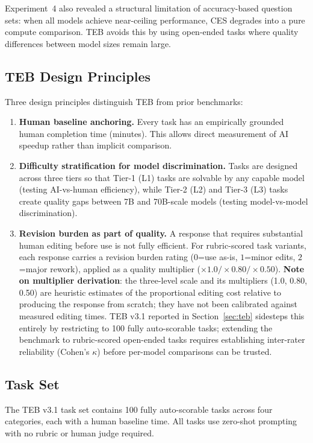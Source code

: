 \documentclass[12pt]{article}
\begin{document}
Experiment~4 also revealed a structural limitation of accuracy-based question sets: when all models achieve near-ceiling performance, CES degrades into a pure compute comparison. TEB avoids this by using open-ended tasks where quality differences between model sizes remain large.

\subsection{TEB Design Principles}

Three design principles distinguish TEB from prior benchmarks:

\begin{enumerate}
    \item \textbf{Human baseline anchoring.} Every task has an empirically grounded human completion time (minutes). This allows direct measurement of AI speedup rather than implicit comparison.
    \item \textbf{Difficulty stratification for model discrimination.} Tasks are designed across three tiers so that Tier-1 (L1) tasks are solvable by any capable model (testing AI-vs-human efficiency), while Tier-2 (L2) and Tier-3 (L3) tasks create quality gaps between 7B and 70B-scale models (testing model-vs-model discrimination).
    \item \textbf{Revision burden as part of quality.} A response that requires substantial human editing before use is not fully efficient. For rubric-scored task variants, each response carries a revision burden rating ($0$=use as-is, $1$=minor edits, $2$=major rework), applied as a quality multiplier ($\times 1.0 / \times 0.80 / \times 0.50$). \textbf{Note on multiplier derivation}: the three-level scale and its multipliers (1.0, 0.80, 0.50) are heuristic estimates of the proportional editing cost relative to producing the response from scratch; they have not been calibrated against measured editing times. TEB v3.1 reported in Section~\ref{sec:teb} sidesteps this entirely by restricting to 100 fully auto-scorable tasks; extending the benchmark to rubric-scored open-ended tasks requires establishing inter-rater reliability (Cohen's $\kappa$) before per-model comparisons can be trusted.
\end{enumerate}

\subsection{Task Set}

The TEB v3.1 task set contains 100 fully auto-scorable tasks across four categories, each with a human baseline time. All tasks use zero-shot prompting with no rubric or human judge required.
\end{document}
